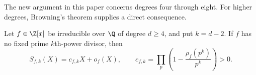 The new argument in this paper concerns degrees four through eight.
For higher degrees, Browning's theorem supplies a direct consequence.

\begin{corollary}\label{cor:all-degrees}
Let $f\in\Z[x]$ be irreducible over $\Q$ of degree $d\ge4$, and
put $k=d-2$. If $f$ has no fixed prime $k$th-power divisor, then
\[
 S_{f,k}(X)=c_{f,k}X+o_f(X),\qquad
 c_{f,k}=\prod_p\left(1-\frac{\rho_f(p^k)}{p^k}\right)>0.
\]
\end{corollary}
